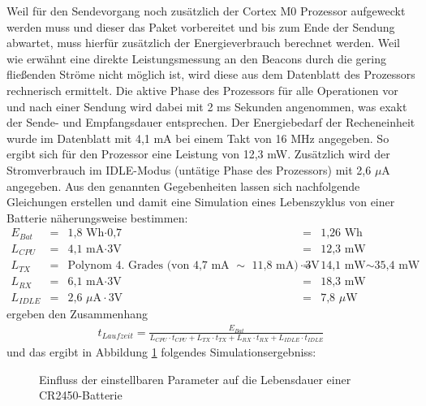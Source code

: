 Weil für den Sendevorgang noch zusätzlich der Cortex M0 Prozessor aufgeweckt werden muss und dieser das Paket vorbereitet und bis zum Ende der Sendung abwartet, muss hierfür zusätzlich der Energieverbrauch berechnet werden. Weil wie erwähnt eine direkte Leistungsmessung an den Beacons durch die gering fließenden Ströme nicht möglich ist, wird diese aus dem Datenblatt des Prozessors rechnerisch ermittelt. Die aktive Phase des Prozessors für alle Operationen vor und nach einer Sendung wird dabei mit 2 ms Sekunden angenommen, was exakt der Sende- und Empfangsdauer entsprechen. Der Energiebedarf der Recheneinheit wurde im Datenblatt mit 4,1 mA bei einem Takt von 16 MHz angegeben. So ergibt sich für den Prozessor eine Leistung von 12,3 mW. Zusätzlich wird der Stromverbrauch im IDLE-Modus (untätige Phase des Prozessors) mit 2,6 $\mu$A angegeben. Aus den genannten Gegebenheiten lassen sich nachfolgende Gleichungen erstellen und damit eine Simulation eines Lebenszyklus von einer Batterie näherungsweise bestimmen:
\begin{align*}
E_{Bat} &=& \text{1,8 Wh} \cdot \text{0,7} &=& \text{1,26 Wh}\\
L_{CPU} &=& \text{4,1 mA} \cdot \text{3V} &=& \text{12,3 mW}\\
L_{TX} &=& \text{Polynom 4. Grades (von 4,7 mA }\sim\text{ 11,8 mA)} \cdot \text{3V} &=& \text{14,1 mW} \sim \text{35,4 mW}\\
L_{RX} &=& \text{6,1 mA} \cdot \text{3V} &=& \text{18,3 mW}\\
L_{IDLE} &=& \text{2,6 } \mu\text{A} \cdot \text{3V} &=& \text{7,8 } \mu\text{W}
\end{align*}
ergeben den Zusammenhang
\begin{align*}
t_{Laufzeit} = \frac{E_{Bat}}{L_{CPU}\cdot t_{CPU} + L_{TX}\cdot t_{TX} + L_{RX}\cdot t_{RX} + L_{IDLE}\cdot t_{IDLE}} 
\end{align*}
und das ergibt in Abbildung \ref{fig:iBBatLe} folgendes Simulationsergebniss:
\pgfplotsset{
    colormap/jet,
}
\begin{figure}[H]
\centering
{}
\caption{Einfluss der einstellbaren Parameter auf die Lebensdauer einer CR2450-Batterie}
\label{fig:iBBatLe}
\end{figure}
